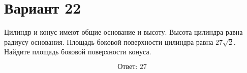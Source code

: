 \documentclass[12pt,a4paper]{article}
\begin{document}
\section*{Вариант 22}

Цилиндр и конус имеют общие основание и высоту.
Высота цилиндра равна радиусу основания.
Площадь боковой поверхности цилиндра равна \(27\sqrt{2}\).
Найдите площадь боковой поверхности конуса.

\begin{center}
\end{center}

\[
\boxed{\text{Ответ: }27}
\]
\end{document}
